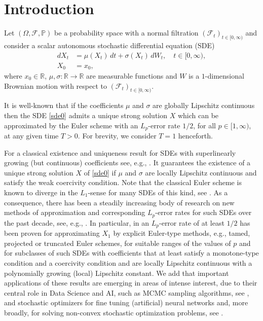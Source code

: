 \documentclass[11pt]{amsart}
\newcommand{\R}{{\mathbb R}}
\newcommand{\PP}{{\mathbb P}}
\theoremstyle{plain}
\theoremstyle{definition}
\begin{document}
\section{Introduction}
Let
$ ( \Omega, \mathcal{F}, \PP ) $
be a probability space with a normal filtration
$ ( \mathcal{F}_t )_{ t \in [0,\infty) } $ and consider a scalar autonomous stochastic differential equation (SDE)
\begin{equation}\label{sde0}
\begin{aligned}
dX_t & = \mu(X_t) \, dt + \sigma(X_t) \, dW_t, \quad t\in [0,\infty),\\
X_0 & = x_0,
\end{aligned}
\end{equation}
where $x_0\in\R$, $\mu, \sigma\colon\R\to\R$ are measurable functions and $W$ is a $1$-dimensional Brownian motion with respect to $ ( \mathcal{F}_t )_{ t \in [0,\infty) } $.

It is well-known that if the coefficients $\mu$ and $\sigma$  are globally Lipschitz continuous then the SDE \eqref{sde0} admits a unique strong solution $X$   which
can be approximated  by the  Euler scheme with an $L_p$-error rate $1/2$, for all $p\in[1, \infty)$,  at any given time $T>0$. For brevity, we consider $T=1$ henceforth.



For a  classical existence and uniqueness result for SDEs with superlinearly growing (but continuous) coefficients  see, e.g., \cite[Theorem 3.1.1]{PrevotRoeckner2007}.  It guarantees the existence of a unique strong solution $X$ of  \eqref{sde0}  if  $\mu$ and $\sigma$ are locally Lipschitz continuous and satisfy   the weak
coercivity condition. Note that the classical Euler scheme is known to diverge  in the $L_1$-sense for many
SDEs of this kind,
see \cite{hjk11}.
As a consequence, there has been a steadily increasing
body of research on new methods of approximation and corresponding $L_p$-error rates for such SDEs over the past decade, see, e.g., \cite{Beynetal2014, Beynetal2016,   FangGiles,  HutzenthalerJentzen2014Memoires, HutzenthalerJentzen2014, hjk12, KumarSabanis2016, Mao2016, Sabanis2013ECP, Sabanis2016,  TretyakovZhang2013, WangGan2013}. In particular, in \cite{Beynetal2014, FangGiles,  hjk12,  Mao2016, Sabanis2013ECP,  Sabanis2016, TretyakovZhang2013} an $L_p$-error rate of at least $1/2$ has been proven for approximating $X_1$ by explicit Euler-type methods,
e.g.,  tamed, projected or  truncated Euler schemes,  for suitable ranges of the values of $p$
and
for  subclasses of such SDEs with coefficients that at least satisfy  a monotone-type condition and  a coercivity condition
and are locally Lipschitz continuous with a polynomially growing  (local)  Lipschitz constant. We add that important applications of these results are emerging in areas of intense interest, due to their central role in Data Science and AI, such as MCMC sampling algorithms, see \cite{tula, hola:19}, and stochastic optimizers for fine tuning (artificial) neural networks and, more broadly, for solving non-convex stochastic optimization problems, see \cite{tusla, Poula}.
\end{document}
